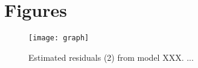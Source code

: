 \section{Figures}

\begin{figure}[ht]
    \begin{center}
        \texttt{[image: graph]}
        \caption{Estimated residuals (2) from model XXX. ...}
        \label{Fig:Resids2}
    \end{center}
\end{figure}
